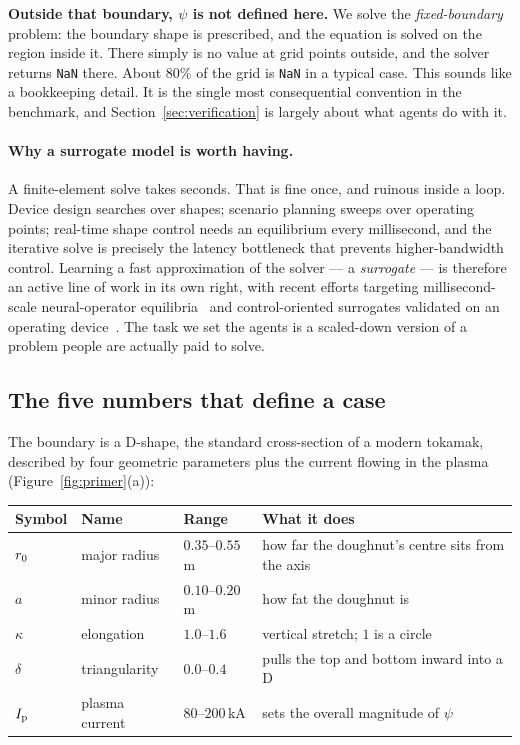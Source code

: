 \textbf{Outside that boundary, $\psi$ is not defined here.} We solve the
\emph{fixed-boundary} problem: the boundary shape is prescribed, and the
equation is solved on the region inside it. There simply is no value at grid
points outside, and the solver returns \texttt{NaN} there. About 80\% of the
grid is \texttt{NaN} in a typical case. This sounds like a bookkeeping detail.
It is the single most consequential convention in the benchmark, and
Section~\ref{sec:verification} is largely about what agents do with it.

\paragraph{Why a surrogate model is worth having.}
A finite-element \GS{} solve takes seconds. That is fine once, and ruinous
inside a loop. Device design searches over shapes; scenario planning sweeps over
operating points; real-time shape control needs an equilibrium every
millisecond, and the iterative solve is precisely the latency bottleneck that
prevents higher-bandwidth control. Learning a fast approximation of the
solver --- a \emph{surrogate} --- is therefore an active line of work in its own
right, with recent efforts targeting millisecond-scale neural-operator
equilibria~\citep{krastev2026millisecond} and control-oriented surrogates
validated on an operating device~\citep{grandin2026experimental}. The task we
set the agents is a scaled-down version of a problem people are actually paid to
solve.

\subsection{The five numbers that define a case}

The boundary is a D-shape, the standard cross-section of a modern tokamak,
described by four geometric parameters plus the current flowing in the plasma
(Figure~\ref{fig:primer}(a)):

\begin{center}
\footnotesize
\begin{tabular}{@{}llll@{}}
\toprule
\textbf{Symbol} & \textbf{Name} & \textbf{Range} & \textbf{What it does} \\
\midrule
$r_{0}$  & major radius   & $0.35$--$0.55$\,m & how far the doughnut's centre sits from the axis \\
$a$       & minor radius   & $0.10$--$0.20$\,m & how fat the doughnut is \\
$\kappa$  & elongation     & $1.0$--$1.6$      & vertical stretch; $1$ is a circle \\
$\delta$  & triangularity  & $0.0$--$0.4$      & pulls the top and bottom inward into a D \\
$I_{\mathrm{p}}$     & plasma current & $80$--$200$\,kA   & sets the overall magnitude of $\psi$ \\
\bottomrule
\end{tabular}
\end{center}

